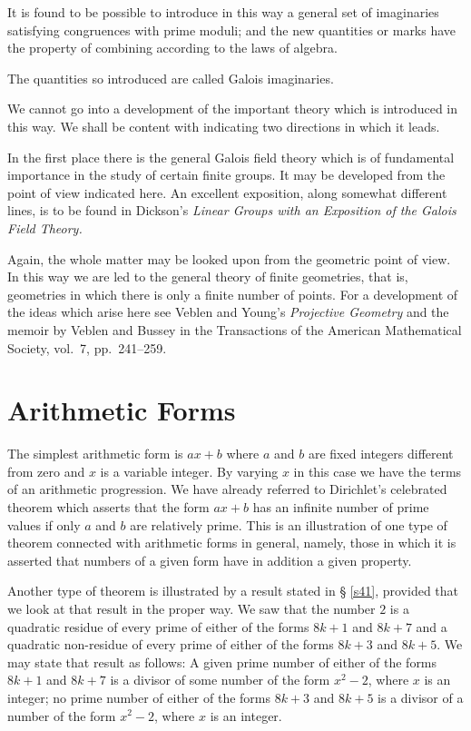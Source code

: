 \documentclass[oneside]{book}
\begin{document}
It is found to be possible to introduce in this way a general set of
imaginaries satisfying congruences with prime moduli; and the new
quantities or marks have the property of combining according to the
laws of algebra.

The quantities so introduced are called Galois imaginaries.

We cannot go into a development of the important theory which is
introduced in this way. We shall be content with indicating two
directions in which it leads.

In the first place there is the general Galois field theory which is
of fundamental importance in the study of certain finite groups. It
may be developed from the point of view indicated here. An excellent
exposition, along somewhat different lines, is to be found in
Dickson's \emph{Linear Groups with an Exposition of the Galois Field
Theory.}

Again, the whole matter may be looked upon from the geometric point
of view. In this way we are led to the general theory of finite
geometries, that is, geometries in which there is only a finite
number of points. For a development of the ideas which arise here
see Veblen and Young's \emph{Projective Geometry} and the memoir by
Veblen and Bussey in the Transactions of the American Mathematical
Society, vol.\ 7, pp.\ 241--259.%

\section{Arithmetic Forms}\label{s43}%

The simplest arithmetic form is $ax + b$ where $a$ and $b$ are fixed
integers different from zero and $x$ is a variable integer. By
varying $x$ in this case we have the terms of an arithmetic
progression. We have already referred to Dirichlet's celebrated
theorem which asserts that the form $ax + b$ has an infinite number
of prime values if only $a$ and $b$ are relatively
prime. This is an illustration of one type of
theorem connected with arithmetic forms in general, namely, those in
which it is asserted that numbers of a given form have in addition a
given property.

Another type of theorem is illustrated by a result stated in \S
\ref{s41}, provided that we look at that result in the proper way.
We saw that the number $2$ is a quadratic residue of every prime of
either of the forms $8k + 1$ and $8k + 7$ and a quadratic
non-residue of every prime of either of the forms $8k + 3$ and $8k +
5$. We may state that result as follows: A given prime number of
either of the forms $8k + 1$ and $8k + 7$ is a divisor of some
number of the form $x^2 - 2$, where $x$ is an integer; no prime
number of either of the forms $8k + 3$ and $8k + 5$ is a divisor of
a number of the form $x^2 - 2$, where $x$ is an integer.
\end{document}
